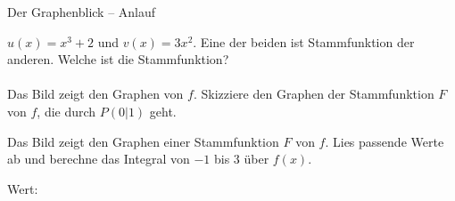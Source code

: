 \begin{aufgabe}{Der Graphenblick – Anlauf}
\begin{teile}
\teil $u(x) = x^3 + 2$ und $v(x) = 3x^2$. Eine der beiden ist Stammfunktion der anderen. Welche ist die Stammfunktion? \\  \\ 
\teil Das Bild zeigt den Graphen von $f$. Skizziere den Graphen der Stammfunktion $F$ von $f$, die durch $P(0 | 1)$ geht.

\begin{ksys}[xmin=-2,xmax=4,ymin=-3,ymax=4]   \end{ksys}
\teil Das Bild zeigt den Graphen einer Stammfunktion $F$ von $f$. Lies passende Werte ab und berechne das Integral von $-1$ bis $3$ über $f(x)$.

\begin{ksys}[xmin=-2,xmax=4,ymin=-1,ymax=5,ablesen]  \end{ksys}
Wert: \leerfeld
\end{teile}
\end{aufgabe}

